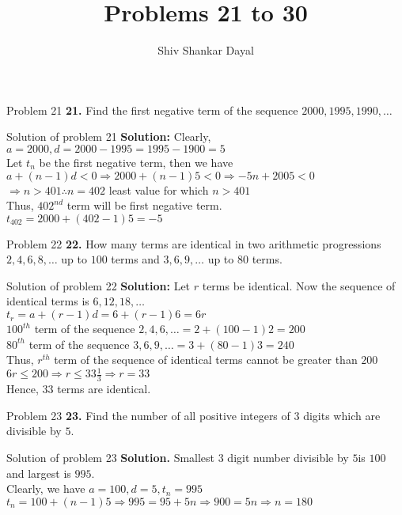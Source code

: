 \documentclass[aspectratio=1610,8pt]{beamer}
\title{Problems 21 to 30}
\author[Shiv Shankar Dayal]{Shiv Shankar Dayal}
\begin{document}
\begin{frame}
       \titlepage
\end{frame}

\begin{frame}{Problem 21}
  \textbf{21.} Find the first negative term of the sequence $2000, 1995, 1990,
  \ldots$
\end{frame}
\begin{frame}{Solution of problem 21}
  \textbf{Solution:} Clearly, $a = 2000, d = 2000 - 1995 = 1995 -1900 = 5$\\
  Let $t_n$ be the first negative term, then we have\\
  $a + (n - 1)d < 0 \Rightarrow 2000 + (n - 1)5 < 0 \Rightarrow -5n + 2005 <
  0$\\
  $\Rightarrow n > 401 \therefore n = 402$ least value for which $n > 401$\\
  Thus, $402^{nd}$ term will be first negative term.\\
  $t_{402} = 2000 + (402 - 1)5 = -5$
\end{frame}
\begin{frame}{Problem 22}
  \textbf{22.} How many terms are identical in two arithmetic progressions $2,
  4, 6, 8, \ldots$ up to $100$ terms and $3, 6, 9, \ldots$ up to $80$ terms.
\end{frame}
\begin{frame}{Solution of problem 22}
  \textbf{Solution:} Let $r$ terms be identical. Now the sequence of identical terms is $6, 12,
  18, \ldots$\\
  $t_r = a + (r - 1)d = 6 + (r - 1)6 = 6r$\\
  $100^{th}$ term of the sequence $2, 4, 6, \ldots = 2 + (100 - 1)2 = 200$\\
  $80^{th}$ term of the sequence $3, 6, 9, \ldots = 3 + (80 - 1)3 = 240$\\
  Thus, $r^{th}$ term of the sequence of identical terms cannot be greater than
  $200$\\
  $6r \leq 200 \Rightarrow r \leq 33\frac{1}{3} \Rightarrow r = 33$\\
  Hence, $33$ terms are identical.
\end{frame}
\begin{frame}{Problem 23}
  \textbf{23.} Find the number of all positive integers of $3$ digits which are
  divisible by $5.$
\end{frame}
\begin{frame}{Solution of problem 23}
  \textbf{Solution.} Smallest $3$ digit number divisible by $5 $is $100$ and
  largest is $995.$\\
  Clearly, we have $a = 100, d = 5, t_n = 995$\\
  $t_n = 100 + (n - 1)5 \Rightarrow 995 = 95 + 5n \Rightarrow 900 = 5n
  \Rightarrow n = 180$
\end{frame}
\end{document}
